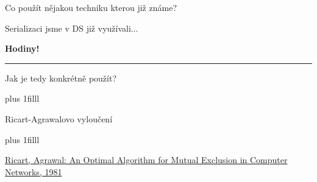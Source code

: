 \documentclass[usenames,dvipsnames,9pt]{beamer}
\begin{document}
\begin{frame}

 \begin{center}
\Large Co použít nějakou techniku kterou již známe?
\end{center}

\pause\vspace{1em}

Serializaci jsme v DS již využívali$\dots $

\pause\vspace{1em}

\hfill \bf\textcolor{BrickRed}{Hodiny!}

    \vspace{2em}\hrule\vspace{1em}

     \begin{center}
\Large Jak je tedy konkrétně použít?
\end{center}



\end{frame}


\begin{frame}[standout]

\vskip0pt plus 1filll %

  Ricart-Agrawalovo vyloučení

\vskip0pt plus 1filll

\begin{flushleft}
\tiny\see\hspace{3pt}\href{https://www.ics.uci.edu/~cs237/reading/files/Ricart and Agrawala An optimal algorithm for mutual exclusion in computer networks.pdf}
{Ricart, Agrawal: An Optimal Algorithm for Mutual Exclusion in Computer Networks, 1981}%
\end{flushleft}
\end{frame}
\end{document}
